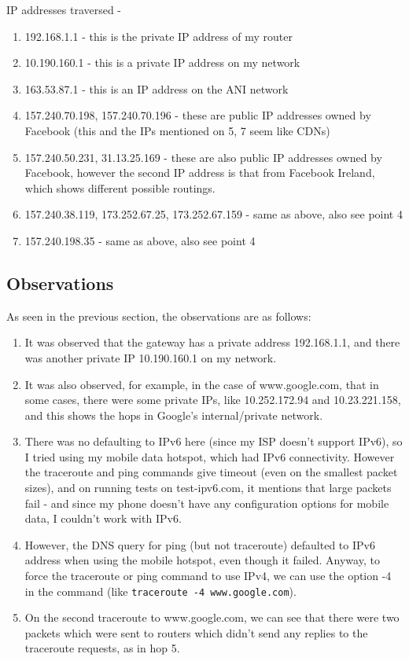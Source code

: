 \documentclass[a4paper]{article}
\begin{document}
IP addresses traversed -
\begin{enumerate}
\item 192.168.1.1 - this is the private IP address of my router
\item 10.190.160.1 - this is a private IP address on my network
\item 163.53.87.1 - this is an IP address on the ANI network
\item 157.240.70.198, 157.240.70.196 - these are public IP addresses owned by Facebook (this and the IPs mentioned on 5, 7 seem like CDNs)
\item 157.240.50.231, 31.13.25.169 - these are also public IP addresses owned by Facebook, however the second IP address is that from Facebook Ireland, which shows different possible routings.
\item 157.240.38.119, 173.252.67.25, 173.252.67.159 - same as above, also see point 4
\item 157.240.198.35 - same as above, also see point 4
\end{enumerate}

\subsection{Observations}

As seen in the previous section, the observations are as follows:

\begin{enumerate}
    \item It was observed that the gateway has a private address 192.168.1.1, and there was another private IP 10.190.160.1 on my network.
    \item It was also observed, for example, in the case of www.google.com, that in some cases, there were some private IPs, like 10.252.172.94 and 10.23.221.158, and this shows the hops in Google's internal/private network.
    \item There was no defaulting to IPv6 here (since my ISP doesn't support IPv6), so I tried using my mobile data hotspot, which had IPv6 connectivity. However the traceroute and ping commands give timeout (even on the smallest packet sizes), and on running tests on test-ipv6.com, it mentions that large packets fail - and since my phone doesn't have any configuration options for mobile data, I couldn't work with IPv6.
    \item However, the DNS query for ping (but not traceroute) defaulted to IPv6 address when using the mobile hotspot, even though it failed. Anyway, to force the traceroute or ping command to use IPv4, we can use the option -4 in the command (like \texttt{traceroute -4 www.google.com}).
    \item On the second traceroute to www.google.com, we can see that there were two packets which were sent to routers which didn't send any replies to the traceroute requests, as in hop 5.
\end{enumerate}
\end{document}
